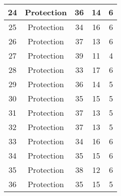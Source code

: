 \documentclass[results.tex]{subfiles}
\begin{document}
\begin{center}
\begin{tabular}{| c || c | c | c | c |}
            \hline
            24                      & Protection                   & 36                     & 14                      & 6                    \\
            \hline
            25                      & Protection                   & 34                     & 16                      & 6                    \\
            \hline
            26                      & Protection                   & 37                     & 13                      & 6                    \\
            \hline
            27                      & Protection                   & 39                     & 11                      & 4                    \\
            \hline
            28                      & Protection                   & 33                     & 17                      & 6                    \\
            \hline
            29                      & Protection                   & 36                     & 14                      & 5                    \\
            \hline
            30                      & Protection                   & 35                     & 15                      & 5                    \\
            \hline
            31                      & Protection                   & 37                     & 13                      & 5                    \\
            \hline
            32                      & Protection                   & 37                     & 13                      & 5                    \\
            \hline
            33                      & Protection                   & 34                     & 16                      & 6                    \\
            \hline
            34                      & Protection                   & 35                     & 15                      & 6                    \\
            \hline
            35                      & Protection                   & 38                     & 12                      & 6                    \\
            \hline
            36                      & Protection                   & 35                     & 15                      & 5                    \\

\end{tabular}
\end{center}
\end{document}
